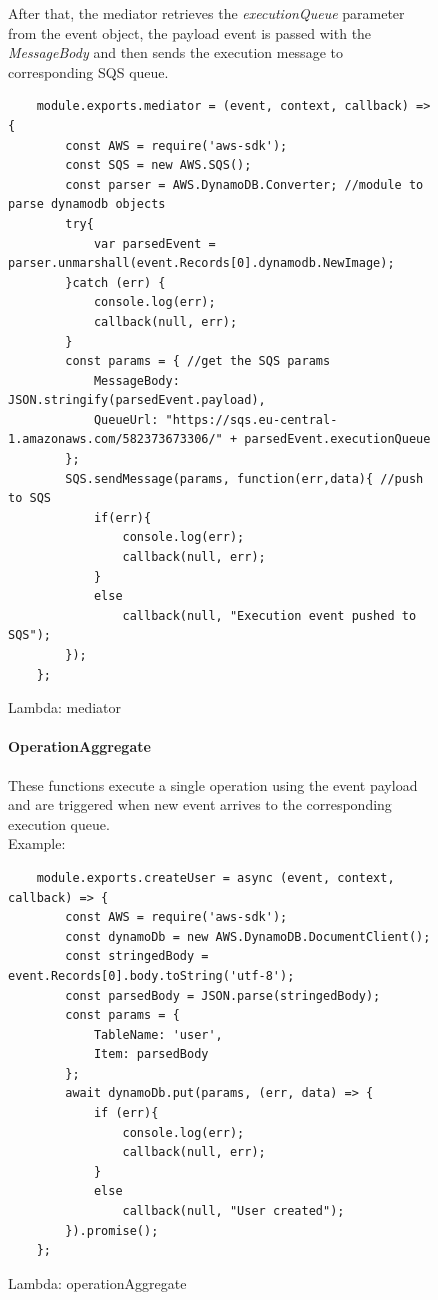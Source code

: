 \begin{figure} [H]

After that, the mediator retrieves the \emph{executionQueue} parameter from the event object, the payload event is passed with the \emph{MessageBody} and then sends the execution message to corresponding SQS queue. 
\begin{lstlisting}
	module.exports.mediator = (event, context, callback) => { 
		const AWS = require('aws-sdk');
		const SQS = new AWS.SQS();
		const parser = AWS.DynamoDB.Converter; //module to parse dynamodb objects
		try{
			var parsedEvent = parser.unmarshall(event.Records[0].dynamodb.NewImage); 
		}catch (err) {
			console.log(err);
			callback(null, err);
		}
		const params = { //get the SQS params 
			MessageBody: JSON.stringify(parsedEvent.payload),
			QueueUrl: "https://sqs.eu-central-1.amazonaws.com/582373673306/" + parsedEvent.executionQueue
		};
		SQS.sendMessage(params, function(err,data){ //push to SQS
			if(err){
				console.log(err);
				callback(null, err);
			}
			else
				callback(null, "Execution event pushed to SQS");
		});
	};
\end{lstlisting}
	\caption{Lambda: mediator}
\end{figure}

\begin{figure} [H]
\paragraph{OperationAggregate} \Spazio
These functions execute a single operation using the event payload and are triggered when new event arrives to the corresponding execution queue.\\
Example:
\begin{lstlisting}
	module.exports.createUser = async (event, context, callback) => {
		const AWS = require('aws-sdk');
		const dynamoDb = new AWS.DynamoDB.DocumentClient();
		const stringedBody = event.Records[0].body.toString('utf-8');
		const parsedBody = JSON.parse(stringedBody);
		const params = {
			TableName: 'user',
			Item: parsedBody
		};
		await dynamoDb.put(params, (err, data) => {
			if (err){
				console.log(err);
				callback(null, err);
			}
			else
				callback(null, "User created");
		}).promise();
	};
\end{lstlisting}
	\caption{Lambda: operationAggregate}
\end{figure}

